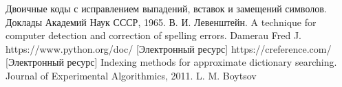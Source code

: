 \documentclass[14pt, a4paper]{report}
\begin{document}
	\newpage
	
	\begin{thebibliography}{}
	 Двоичные коды с исправлением выпадений, вставок и замещений символов. Доклады Академий Наук СССР, 1965. В. И. Левенштейн.
	 A technique for computer detection and correction of spelling errors. Damerau Fred J.
	 https://www.python.org/doc/ [Электронный ресурс]
	 https://creference.com/ [Электронный ресурс]
	 Indexing methods for approximate dictionary searching. Journal of Experimental Algorithmics, 2011. L. M. Boytsov
	\end{thebibliography}
\end{document}
